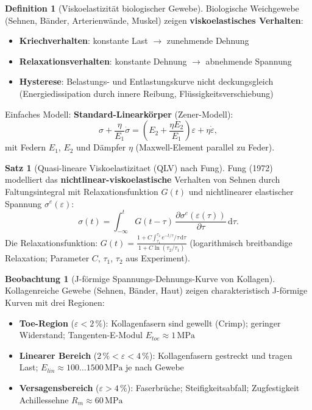 ﻿\documentclass[a4paper,12pt]{report}
\theoremstyle{definition}
\newtheorem{definition}{Definition}
\newtheorem{satz}{Satz}
\newtheorem{beobachtung}{Beobachtung}
\begin{document}
\begin{definition}[Viskoelastizität biologischer Gewebe]
Biologische Weichgewebe (Sehnen, Bänder, Arterienwände, Muskel)
zeigen \textbf{viskoelastisches Verhalten}:
\begin{itemize}
    \item[-] \textbf{Kriechverhalten}: konstante Last $\to$ zunehmende Dehnung
    \item[-] \textbf{Relaxationsverhalten}: konstante Dehnung $\to$ abnehmende Spannung
    \item[-] \textbf{Hysterese}: Belastungs- und Entlastungskurve nicht deckungsgleich
          (Energiedissipation durch innere Reibung, Flüssigkeitsverschiebung)
\end{itemize}
Einfaches Modell: \textbf{Standard-Linearkörper} (Zener-Modell):
\[
  \sigma + \frac{\eta}{E_1}\dot{\sigma} = \left(E_2 + \frac{\eta E_2}{E_1}\right)\varepsilon
  + \eta\dot{\varepsilon},
\]
mit Federn $E_1$, $E_2$ und Dämpfer $\eta$ (Maxwell-Element parallel zu Feder).
\end{definition}

\begin{satz}[Quasi-lineare Viskoelastizitaet (QLV) nach Fung]
Fung (1972) modelliert das \textbf{nichtlinear-viskoelastische} Verhalten
von Sehnen durch Faltungsintegral mit Relaxationsfunktion $G(t)$
und nichtlinearer elastischer Spannung $\sigma^e(\varepsilon)$:
\[
  \sigma(t) = \int_{-\infty}^t G(t-\tau)\,\frac{\partial\sigma^e(\varepsilon(\tau))}{\partial\tau}\,\mathrm{d}\tau.
\]
Die Relaxationsfunktion: $G(t) = \frac{1 + C\int_{\tau_1}^{\tau_2} e^{-t/\tau}/\tau\,\mathrm{d}\tau}{1 + C\ln(\tau_2/\tau_1)}$
(logarithmisch breitbandige Relaxation; Parameter $C$, $\tau_1$, $\tau_2$ aus Experiment).
\end{satz}

\begin{beobachtung}[J-förmige Spannungs-Dehnungs-Kurve von Kollagen]
Kollagenreiche Gewebe (Sehnen, Bänder, Haut) zeigen charakteristisch
J-förmige Kurven mit drei Regionen:
\begin{itemize}
    \item[-] \textbf{Toe-Region} ($\varepsilon < 2\,\%$): Kollagenfasern sind
          gewellt (Crimp); geringer Widerstand; Tangenten-E-Modul $E_{toe} \approx 1\,\mathrm{MPa}$
    \item[-] \textbf{Linearer Bereich} ($2\,\% < \varepsilon < 4\,\%$): Kollagenfasern
          gestreckt und tragen Last; $E_{lin} \approx 100\ldots1500\,\mathrm{MPa}$ je nach Gewebe
    \item[-] \textbf{Versagensbereich} ($\varepsilon > 4\,\%$): Faserbrüche;
          Steifigkeitsabfall; Zugfestigkeit Achillessehne $R_m \approx 60\,\mathrm{MPa}$
\end{itemize}
\end{beobachtung}
\end{document}
